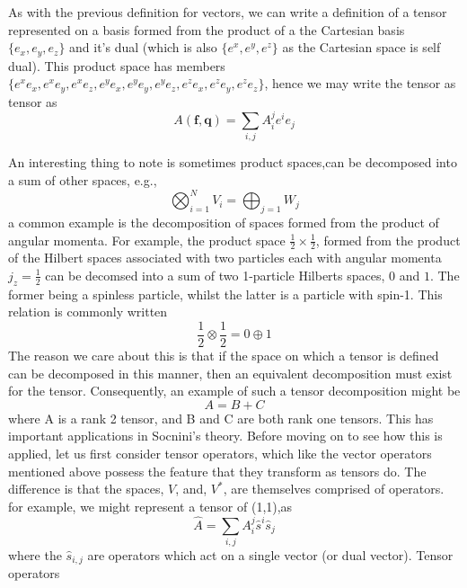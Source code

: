 \documentclass[12pt]{article}
\begin{document}
\noindent As with the previous definition for vectors, we can write
a definition of a tensor represented on a basis formed from the product of a
the Cartesian basis $\{ e_{x},e_{y},e_{z}\}$ and it's dual (which is also
$\{e^{x},e^{y},e^{z}\}$ as the Cartesian space is self dual). This product
space has members $\{ e^{x}e_{x}, e^{x}e_{y}, e^{x}e_{z}, e^{y}e_{x},
e^{y}e_{y}, e^{y}e_{z}, e^{z}e_{x}, e^{z}e_{y}, e^{z}e_{z} \}$, hence we
may write the tensor as tensor as
\begin{equation}
A(\mathbf{f},\mathbf{q}) = \sum_{i,j} A_{i}^{j}e^{i}e_{j}
\end{equation}
\noindent 

\noindent An interesting thing to note is sometimes product spaces,can
be decomposed into a sum of other spaces, e.g.,
\begin{equation}
\bigotimes_{i=1}^{N} V_{i} =  \bigoplus_{j=1} W_{j}
\end{equation}
a common example is the decomposition of spaces formed from the product of angular momenta. For example,
the product space $\frac{1}{2} \times \frac{1}{2}$, formed from the product of the Hilbert spaces associated
with two particles each with angular momenta $j_{z} = \frac{1}{2}$ can be decomsed into a sum of two
1-particle Hilberts spaces, $0$ and $1$. The former being a spinless particle, whilst the latter is
a particle with spin-1. This relation is commonly written
\begin{equation}
\frac{1}{2}\otimes \frac{1}{2} = 0\oplus 1
\end{equation}
\noindent The reason we care about this is that if the space on which a tensor is defined can be decomposed in
this manner, then an equivalent decomposition must exist for the tensor. Consequently, an example of such a tensor 
decomposition might be
\begin{equation}
A = B+C
\end{equation}
where A is a rank 2 tensor, and B and C are both rank one tensors. This has important applications in 
Socnini's theory. Before moving on to see how this is applied, let us first consider tensor operators, 
which like the vector operators mentioned above possess the feature that they transform 
as tensors do. The difference is that the spaces, $V$, and, $V^{*}$, are themselves comprised of operators.
for example,  we might represent a tensor of (1,1),as 
\begin{equation}
\hat{A} = \sum_{i,j} A_{i}^{j}\hat{s}^{i}\hat{s}_{j}
\end{equation}
where the ${\hat{s}_{i,j}}$ are operators which act on a single vector (or dual vector). Tensor operators
\end{document}

